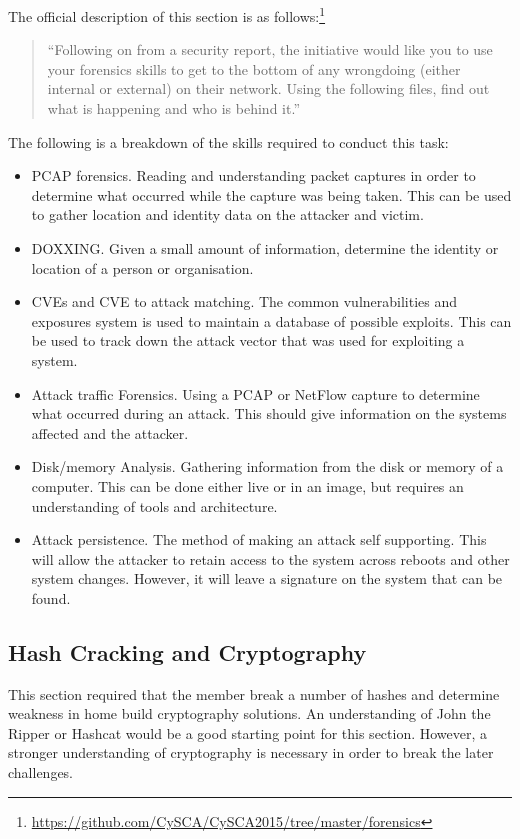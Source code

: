 \documentclass[a4paper,11pt]{report}
\begin{document}
			The official description of this section is as follows:\footnote{\url{https://github.com/CySCA/CySCA2015/tree/master/forensics}}
			\begin{quote}
				``Following on from a security report, the initiative would like you to use your forensics skills to get to the bottom of any wrongdoing (either internal or external) on their network. Using the following files, find out what is happening and who is behind it.'' 
			\end{quote}
			The following is a breakdown of the skills required to conduct this task:
			\begin{itemize}
				\item PCAP forensics.
					Reading and understanding packet captures in order to determine what occurred while the capture was being taken. 
					This can be used to gather location and identity data on the attacker and victim. 
				\item DOXXING. 
					Given a small amount of information, determine the identity or location of a person or organisation.
				\item CVEs and CVE to attack matching.
					The common vulnerabilities and exposures system is used to maintain a database of possible exploits. 
					This can be used to track down the attack vector that was used for exploiting a system. 
				\item Attack traffic Forensics.
					Using a PCAP or NetFlow capture to determine what occurred during an attack. 
					This should give information on the systems affected and the attacker. 
				\item Disk/memory Analysis.
					Gathering information from the disk or memory of a computer. 
					This can be done either live or in an image, but requires an understanding of tools and architecture.
				\item Attack persistence.
					The method of making an attack self supporting. 
					This will allow the attacker to retain access to the system across reboots and other system changes. 
					However, it will leave a signature on the system that can be found. 
			\end{itemize}

		\subsection{Hash Cracking and Cryptography}
			This section required that the member break a number of hashes and determine weakness in home build cryptography solutions. 
			An understanding of John the Ripper or Hashcat would be a good starting point for this section. 
			However, a stronger understanding of cryptography is necessary in order to break the later challenges. 
			
\end{document}
